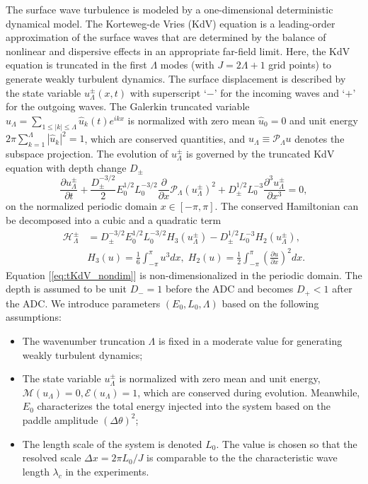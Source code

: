 \documentclass[9pt,twocolumn,twoside,lineno]{pnas-new}
\begin{document}
The surface wave turbulence is modeled by a one-dimensional deterministic
dynamical model. 
The Korteweg-de Vries (KdV) equation \cite{johnson1997modern}
is a leading-order approximation of the surface waves that are determined
by the balance of nonlinear and dispersive effects in an appropriate
far-field limit. Here, the KdV equation is truncated in the first
$\Lambda$ modes (with $J=2\Lambda+1$ grid points) to generate weakly
turbulent dynamics. The surface displacement is described by
the state variable $u_{\Lambda}^{\pm}\left(x,t\right)$ with superscript `$-$'
for the incoming waves and `$+$' for the outgoing waves. The Galerkin
truncated variable $u_{\Lambda}=\sum_{1\leq\left|k\right|\leq\Lambda}\hat{u}_{k}\left(t\right)e^{ikx}$
is normalized with zero mean $\hat{u}_{0}=0$ and unit energy $2\pi\sum_{k=1}^{\Lambda}\left|\hat{u}_{k}\right|^{2}=1$,
which are conserved quantities, and $u_{\Lambda}\equiv\mathcal{P}_{\Lambda}u$
denotes the subspace projection. The evolution of  $u_{\Lambda}^{\pm}$ is governed by the truncated
KdV equation with depth change $D_{\pm}$
\begin{equation}
\frac{\partial u_{\Lambda}^{\pm}}{\partial t}+\frac{D_{\pm}^{-3/2}}{2}E_{0}^{1/2}L_{0}^{-3/2}\frac{\partial}{\partial x}\mathcal{P}_{\Lambda}\left(u_{\Lambda}^{\pm}\right)^{2}+D_{\pm}^{1/2}L_{0}^{-3}\frac{\partial^{3}u_{\Lambda}^{\pm}}{\partial x^{3}}=0,\label{eq:tKdV_nondim}
\end{equation}
on the normalized periodic domain $x\in\left[-\pi,\pi\right]$. The conserved Hamiltonian can be decomposed into a cubic and a quadratic term
\begin{align*}
\mathcal{H}_{\Lambda}^{\pm} & =  D_{\pm}^{-3/2}E_{0}^{1/2}L_{0}^{-3/2}H_{3}\left(u_{\Lambda}^{\pm}\right)-D_{\pm}^{1/2}L_{0}^{-3}H_{2}\left(u_{\Lambda}^{\pm}\right),\\
& H_{3}\left(u\right) =  \frac{1}{6}\int_{-\pi}^{\pi}u^{3}dx,\;H_{2}\left(u\right)=\frac{1}{2}\int_{-\pi}^{\pi}\left(\frac{\partial u}{\partial x}\right)^{2}dx.
\end{align*}
Equation [\ref{eq:tKdV_nondim}] is non-dimensionalized in the periodic
domain. The depth is assumed to be unit $D_{-}=1$
before the ADC and becomes $D_{+}<1$
after the ADC. We introduce parameters $\left(E_{0},L_{0},\Lambda\right)$
based on the following assumptions:
\begin{itemize}
\item The wavenumber truncation $\Lambda$ is fixed in a moderate value
for generating weakly turbulent dynamics;
\item The state variable $u_{\Lambda}^{\pm}$ is normalized with zero mean
and unit energy, $\mathcal{M}\left(u_{\Lambda}\right)=0,\mathcal{E}\left(u_{\Lambda}\right)=1$,
which are conserved during evolution. Meanwhile, $E_{0}$ characterizes the total
energy injected into the system based on the paddle amplitude $\left(\Delta\theta\right)^{2}$;
\item The length scale of the system is denoted $L_{0}$. The value is
chosen so that the resolved scale $\Delta x=2\pi L_{0}/J$ is comparable
to the the characteristic wave length $\lambda_{c}$ in
the experiments.
\end{itemize}
\end{document}
